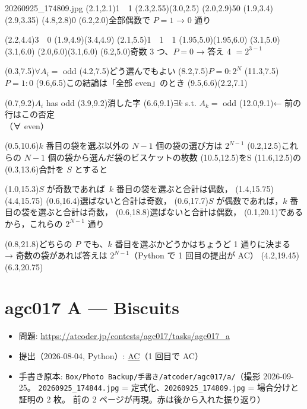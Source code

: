 \documentclass[a4paper]{article}
\begin{document}
\begin{memopage}{20260925\_174809.jpg}
  \hw(2.1,2.1){1\ \ 1}
  \hwline(2.3,2.55)(3.0,2.5)
  \hw(2.0,2.9){50}
  \hwline(1.9,3.4)(2.9,3.35)
  \hw(4.8,2.8){0}
  \redpen(6.2,2.0){全部偶数で $P=1$ → 0 通り}

  \hw(2.2,4.4){3\ \ 0}
  \hwline(1.9,4.9)(3.4,4.9)
  \hw(2.1,5.5){1\ \ 1\ \ 1}
  \hwline(1.95,5.0)(1.95,6.0) \hwline(3.1,5.0)(3.1,6.0) \hwline(2.0,6.0)(3.1,6.0)
  \redpen(6.2,5.0){奇数 3 つ、$P=0$ → 答え 4 $= 2^{3-1}$}

  \hw(0.3,7.5){$\forall A_i = $ odd}
  \hw(4.2,7.5){\large どう選んでもよい}
  \hw(8.2,7.5){$P=0 : 2^N$}
  \hw(11.3,7.5){$P=1 : 0$}
  \redpen(9.6,6.5){この結論は「全部 even」のとき}
  \redarrow(9.5,6.6)(2.2,7.1)

  \hw(0.7,9.2){$A_i$ has odd}
  \hwunread(3.9,9.2){消した字}
  \hw(6.6,9.1){$\exists k$ s.t. $A_k = $ odd}
  \redpen(12.0,9.1){← 前の行はこの否定\\（∀ even）}

  \hw(0.5,10.6){\large $k$ 番目の袋を選ぶ以外の $N-1$ 個の袋の選び方は $2^{N-1}$}
  \hw(0.2,12.5){\large これらの $N-1$ 個の袋から選んだ袋のビスケットの枚数}
  \hwstrike(10.5,12.5){\large をS}
  \hw(11.6,12.5){\large の}
  \hw(0.3,13.6){\large 合計を $S$ とすると}

  \hw(1.0,15.3){\large $S$ が奇数であれば\ $k$ 番目の袋を選ぶと合計は偶数，}
  \hwline(1.4,15.75)(4.4,15.75)
  \hw(0.6,16.4){\large 選ばないと合計は奇数，}
  \hw(0.6,17.7){\large $S$ が偶数であれば，$k$ 番目の袋を選ぶと合計は奇数，}
  \hw(0.6,18.8){\large 選ばないと合計は偶数，}
  \hw(0.1,20.1){\large であるから，これらの $2^{N-1}$ 通り}

  \redpen(0.8,21.8){どちらの $P$ でも、$k$ 番目を選ぶかどうかはちょうど 1 通りに決まる\\→ 奇数の袋があれば答えは $2^{N-1}$（Python で 1 回目の提出が AC）}
  \redbox(4.2,19.45)(6.3,20.75)
\end{memopage}

\clearpage
\section*{agc017 A --- Biscuits}

\begin{itemize}
  \item 問題: \url{https://atcoder.jp/contests/agc017/tasks/agc017_a}
  \item 提出（2026-08-04, Python）:
    \href{https://atcoder.jp/contests/agc017/submissions/78114748}{AC}（1 回目で AC）
  \item 手書き原本: \texttt{Box/Photo Backup/手書き/atcoder/agc017/a/}（撮影 2026-09-25。
    \texttt{20260925\_174844.jpg} = 定式化、\texttt{20260925\_174809.jpg} = 場合分けと証明の 2 枚。
    前の 2 ページが再現。赤は後から入れた振り返り）
\end{itemize}
\end{document}
